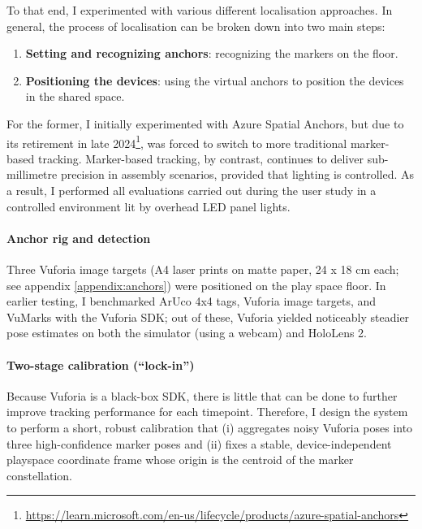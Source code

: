 To that end, I experimented with various different localisation approaches. In general, the process of localisation can be broken down into two main steps:
\begin{enumerate}
    \item \textbf{Setting and recognizing anchors}: recognizing the markers on the floor.
    \item \textbf{Positioning the devices}: using the virtual anchors to position the devices in the shared space.
\end{enumerate}

For the former, I initially experimented with Azure Spatial Anchors, but due to its retirement in late 2024\footnote{\url{https://learn.microsoft.com/en-us/lifecycle/products/azure-spatial-anchors}}, was forced to switch to more traditional marker-based tracking.
Marker-based tracking, by contrast, continues to deliver sub-millimetre precision in assembly scenarios, provided that lighting is controlled. As a result, I performed all evaluations carried out during the user study in a controlled environment lit by overhead LED panel lights.

\paragraph{Anchor rig and detection}
Three Vuforia image targets (A4 laser prints on matte paper, 24 x 18 cm each; see appendix \ref{appendix:anchors}) were positioned on the play space floor. 
In earlier testing, I benchmarked ArUco 4x4 tags, Vuforia image targets, and VuMarks with the Vuforia SDK; out of these, Vuforia yielded noticeably steadier pose estimates on both the simulator (using a webcam) and HoloLens 2.

\paragraph{Two-stage calibration (“lock-in”)}
Because Vuforia is a black-box SDK, there is little that can be done to further improve tracking performance for each timepoint. Therefore, I design the system to perform a short, robust calibration that (i) aggregates noisy Vuforia poses into three high-confidence marker poses and (ii) fixes a stable, device-independent playspace coordinate frame whose origin is the centroid of the marker constellation.

